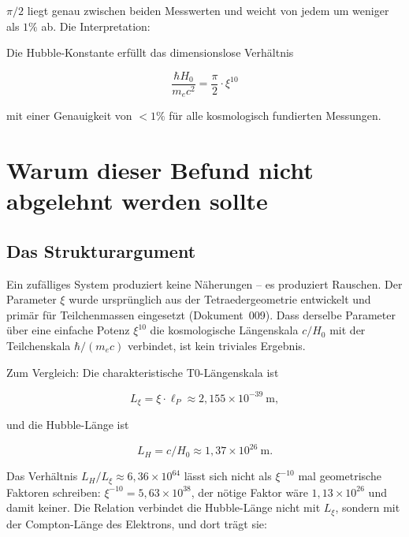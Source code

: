 $\pi/2$ liegt genau zwischen beiden Messwerten und weicht von jedem um weniger
als $1\%$ ab. Die Interpretation:

\begin{keyresult}
    Die Hubble-Konstante erfüllt das dimensionslose Verhältnis

    \begin{equation}
        \frac{\hbar H_0}{m_e c^2} = \frac{\pi}{2} \cdot \xi^{10}
        \label{eq:ratio_central}
    \end{equation}

    mit einer Genauigkeit von $<1\%$ für alle kosmologisch fundierten
    Messungen.
\end{keyresult}

\section{Warum dieser Befund nicht abgelehnt werden sollte}
\label{sec:argument}

\subsection{Das Strukturargument}

Ein zufälliges System produziert keine Näherungen -- es produziert Rauschen.
Der Parameter $\xi$ wurde ursprünglich aus der Tetraedergeometrie entwickelt
und primär für Teilchenmassen eingesetzt (Dokument~009). Dass derselbe
Parameter über eine einfache Potenz $\xi^{10}$ die kosmologische
Längenskala $c/H_0$ mit der Teilchenskala $\hbar/(m_e c)$ verbindet,
ist kein triviales Ergebnis.

Zum Vergleich: Die charakteristische T0-Längenskala ist

\begin{equation}
    L_\xi = \xi \cdot \ell_P \approx 2{,}155 \times 10^{-39}\ \text{m},
\end{equation}

und die Hubble-Länge ist

\begin{equation}
    L_H = c / H_0 \approx 1{,}37 \times 10^{26}\ \text{m}.
\end{equation}

Das Verhältnis $L_H / L_\xi \approx 6{,}36 \times 10^{64}$ lässt sich nicht als
$\xi^{-10}$ mal geometrische Faktoren schreiben: $\xi^{-10} = 5{,}63\times10^{38}$, der
nötige Faktor wäre $1{,}13\times10^{26}$ und damit keiner. Die Relation verbindet die
Hubble-Länge nicht mit $L_\xi$, sondern mit der Compton-Länge des Elektrons, und dort
trägt sie:

